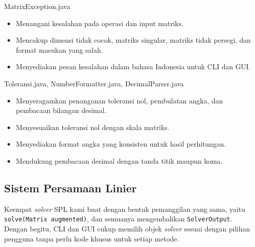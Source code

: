\begin{kelas}{MatrixException.java}
\begin{itemize}
\item Menangani kesalahan pada operasi dan input matriks.
\item Mencakup dimensi tidak cocok, matriks singular, matriks tidak persegi, dan format masukan yang salah.
\item Menyediakan pesan kesalahan dalam bahasa Indonesia untuk CLI dan GUI.
\end{itemize}
\end{kelas}

\begin{kelas}{Toleransi.java, NumberFormatter.java, DecimalParser.java}
\begin{itemize}
\item Menyeragamkan penanganan toleransi nol, pembulatan angka, dan pembacaan bilangan desimal.
\item Menyesuaikan toleransi nol dengan skala matriks.
\item Menyediakan format angka yang konsisten untuk hasil perhitungan.
\item Mendukung pembacaan desimal dengan tanda titik maupun koma.
\end{itemize}
 
 
 
 
 
\end{kelas}

\subsection{Sistem Persamaan Linier}

Keempat \textit{solver} SPL kami buat dengan bentuk pemanggilan yang sama, yaitu \texttt{solve(Matrix augmented)}, dan semuanya mengembalikan \texttt{SolverOutput}. Dengan begitu, CLI dan GUI cukup memilih objek \textit{solver} sesuai dengan pilihan pengguna tanpa perlu kode khusus untuk setiap metode.

